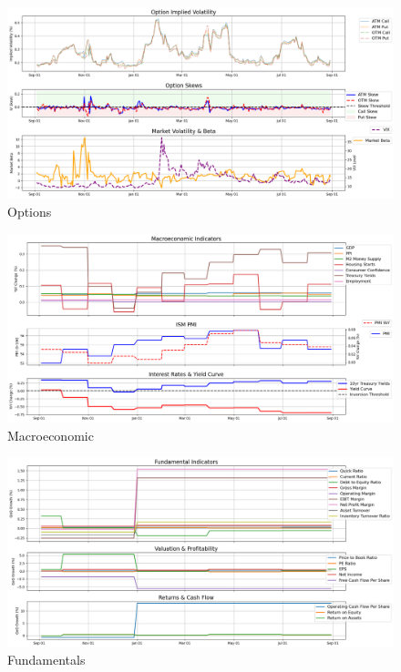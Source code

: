 \documentclass[8pt]{scrartcl}
\begin{document}
\begin{figure}[H]
    \centering
    \includegraphics[width=1\linewidth]{judge_reviews/AMZN_M_gpt-4o-mini/2018-09-03/judge_Option_Implied_Volatility.png}
    \caption{Options}
\end{figure}

\begin{figure}[H]
    \centering
    \includegraphics[width=1\linewidth]{judge_reviews/AMZN_M_gpt-4o-mini/2018-09-03/judge_Macroeconomic_Indicators.png}
    \caption{Macroeconomic}
\end{figure}

\begin{figure}[H]
    \centering
    \includegraphics[width=1\linewidth]{judge_reviews/AMZN_M_gpt-4o-mini/2018-09-03/judge_Fundamental_Indicators.png}
    \caption{Fundamentals}
\end{figure}
\end{document}

